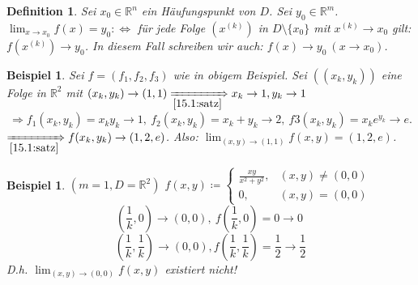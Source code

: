 \documentclass[12pt]{extreport} %
\newcommand{\R}{\mathbb{R}}
\theoremstyle{named}
\theoremstyle{nnamed}
\theoremstyle{itshape}
\newtheorem*{definition}{Definition}
\theoremstyle{normal}
\newtheorem{beispiel}[unnamedtheorem]{Beispiel}
\newtheorem*{beispiel*}{Beispiel}
\begin{document}
\begin{definition}
	Sei $x_{0} \in \R^{n}$ ein Häufungspunkt von $D$. Sei $y_{0} \in \R^{m}$. $\lim_{x \rightarrow x_{0}} f(x) = y_{0} : \iff$ für jede Folge $\left(x^{(k)} \right)$ in $D \setminus \{ x_{0} \}$ mit $x^{(k)} \rightarrow x_{0}$ gilt: $f\left( x^{(k)} \right) \rightarrow y_{0}$. In diesem Fall schreiben wir auch: $f(x) \rightarrow y_{0} ~ (x \rightarrow x_{0})$.
\end{definition}


\begin{beispiel*}
	Sei $f = (f_{1}, f_{2}, f_{3})$ wie in obigem Beispiel. Sei $\left( (x_{k}, y_{k}) \right)$ eine Folge in $\R^{2}$ mit $(x_{k}, y_{k}) \rightarrow (1, 1) \xRightarrow[\ref{15.1:satz}]{} x_{k} \rightarrow 1, y_{k} \rightarrow 1$
	$$ \Rightarrow f_{1}(x_{k}, y_{k}) = x_{k} y_{k} \rightarrow 1, ~ f_{2}(x_{k}, y_{k}) = x_{k} + y_{k} \rightarrow 2, ~ f{3}(x_{k}, y_{k}) = x_{k} e^{y_{k}} \rightarrow e. $$
	$\xRightarrow[\ref{15.1:satz}]{} f(x_{k}, y_{k}) \rightarrow (1, 2, e)$. Also: $\lim_{(x, y) \rightarrow (1, 1)} f(x, y) = (1, 2, e)$.
\end{beispiel*}


\begin{beispiel} $(m = 1, D = \R^{2})$ \label{16.1:bsp}
	$f(x, y) \coloneqq \begin{cases}
							\frac{xy}{x^{2} + y^{2}}, & (x, y) \neq (0, 0) \\
							0, & (x, y) = (0, 0)
						 \end{cases}$
	$$ \left( \frac{1}{k}, 0 \right) \rightarrow (0, 0), ~ f\left( \frac{1}{k}, 0 \right) = 0 \rightarrow 0 ~$$
	$$ \left( \frac{1}{k}, \frac{1}{k} \right) \rightarrow (0, 0),  f\left( \frac{1}{k}, \frac{1}{k} \right) = \frac{1}{2} \rightarrow \frac{1}{2} $$
	D.h. $\lim_{(x, y) \rightarrow (0, 0)} f(x, y)$ existiert nicht!	
\end{beispiel}
\end{document}
